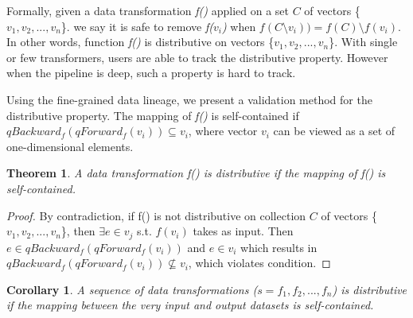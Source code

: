 \documentclass{sig-alternate}
\newtheorem{theorem}{Theorem}[section]
\newtheorem{corollary}{Corollary}[theorem]
\begin{document}
Formally, given a data transformation {\it f()} applied on a set $C$ of vectors \{$v_1, v_2, ..., v_n$\}.
we say it is safe to remove {\it f($v_i$)} when {\it $f(C \setminus {v_i})) = f(C) \setminus {f(v_i)}$}.
In other words, function {\it f()} is distributive on vectors \{$v_1, v_2, ..., v_n$\}. 
With single or few transformers, users are able to track the distributive property.
However when the pipeline is deep, such a property is hard to track.

Using the fine-grained data lineage, we present a validation method for the distributive property.
The mapping of {\it f()} is self-contained if $qBackward_f(qForward_f(v_i)) \subseteq v_i$, where vector $v_i$ can be viewed 
as a set of one-dimensional elements.


\begin{theorem}
\label{thm:distributive}
A data transformation f() is distributive if the mapping of f() is self-contained.
\end{theorem}

\begin{proof}
By contradiction, if f() is not distributive on collection $C$ of vectors  \{$v_1, v_2, ..., v_n$\}, then $\exists e \in v_j $ s.t. $f(v_i)$ takes as input.
Then $e \in qBackward_f(qForward_f(v_i))$ and $e \in v_i$ which results in  $qBackward_f(qForward_f(v_i)) \nsubseteq v_i$, which violates condition.
\end{proof}

\begin{corollary}
A sequence of data transformations ($s = {f_1, f_2, ..., f_n}$) is distributive if the mapping between the very input and output datasets is self-contained.
\end{corollary}



\end{document}
